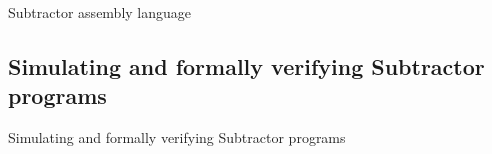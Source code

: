 Subtractor assembly language

\subsection{Simulating and formally verifying Subtractor programs}

Simulating and formally verifying Subtractor programs











